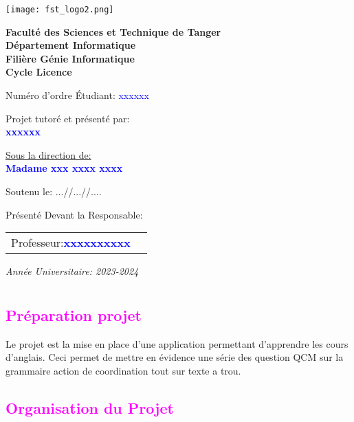 \documentclass[12pt, a4paper]{report}
\begin{document}
\begin{center}
\texttt{[image: fst\_logo2.png]}
\vfill

\large{\textbf{
Faculté des Sciences et Technique de Tanger\\
Département Informatique\\
Filière Génie Informatique\\
Cycle Licence\\}}
\vfill
\vfill
\begin{flushright}
Numéro d'ordre Étudiant: \textcolor{blue}{xxxxxx}
\end{flushright}
\vfill
\large{Projet tutoré et présenté par:}\\
\textbf{\textcolor{blue}{xxxxxx}}

\vfill
\underline{Sous la direction de:}\\
\textbf{\textcolor{blue}{Madame xxx xxxx xxxx}}
\vfill

Soutenu le: ...//...//....
\end{center}
\vfill
Présenté Devant la Responsable:
\bigskip

\begin{tabular}{ll}
Professeur:\textbf{\textcolor{blue}{xxxxxxxxxx}}\\
\end{tabular}
\bigskip

\centering\emph{Année Universitaire: 2023-2024}
\vfill

\newpage

\tableofcontents
\chapter{}
\textcolor{magenta}{\section{Préparation projet}}

Le projet est la mise en place d’une application permettant d’apprendre les cours d’anglais. Ceci permet de mettre en évidence une série des question QCM sur la grammaire action de coordination tout sur texte a trou.
\textcolor{magenta}{\section{Organisation du Projet}}
\end{document}
